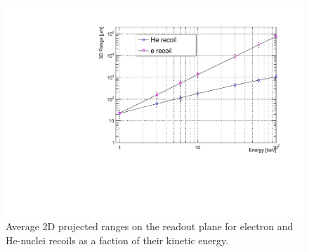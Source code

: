 \documentclass[physics,article,submit,moreauthors,pdftex]{Definitions/mdpi}
\newcommand{\lemon}{{\textsc{Lemon}}\xspace}
\begin{document}
\begin{figure}[t!]
  \begin{center}
    \includegraphics[width=0.49\linewidth]{range_ER_NR.pdf}
    \caption{Average 2D projected ranges on the readout plane for electron and He-nuclei recoils as a faction of their kinetic energy.}
      \label{fig:range}
      \end{center}
\end{figure}








\end{document}
